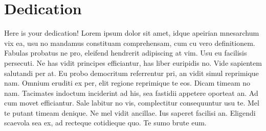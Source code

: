 \chapter*{Dedication}
 Here is your dedication!
Lorem ipsum dolor sit amet, idque apeirian mnesarchum vix ea, usu no mandamus constituam comprehensam, cum cu vero definitionem. Fabulas probatus ne pro, eleifend hendrerit adipiscing at vim. Usu eu facilisis persecuti. Ne has vidit principes efficiantur, has liber euripidis no. Vide sapientem salutandi per at. Eu probo democritum referrentur pri, an vidit simul reprimique nam. Omnium eruditi ex per, elit regione reprimique te eos. Dicam timeam no nam. Tacimates indoctum inciderint ad his, sea fastidii appetere oporteat an. Ad cum movet efficiantur. Sale labitur no vis, complectitur consequuntur usu te. Mel te putant timeam denique. Ne mel vidit ancillae. Ius saperet facilisi an. Eligendi scaevola sea ex, ad recteque cotidieque quo. Te sumo brute eum.